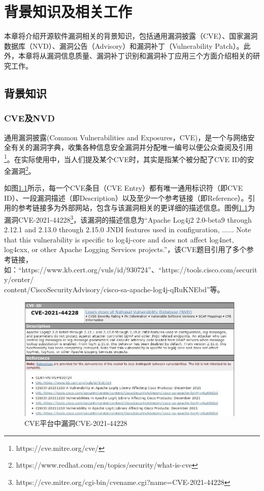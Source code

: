 \chapter{背景知识及相关工作}
本章将介绍开源软件漏洞相关的背景知识，包括通用漏洞披露（CVE）、国家漏洞数据库（NVD）、漏洞公告（Advisory）和漏洞补丁（Vulnerability Patch）。此外，本章将从漏洞信息质量、漏洞补丁识别和漏洞补丁应用三个方面介绍相关的研究工作。


\section{背景知识}

\subsection{CVE及NVD} 
通用漏洞披露(Common Vulnerabilities and Exposures，CVE)\cite{mitre2021:cve}，是一个与网络安全有关的漏洞字典，收集各种信息安全漏洞并分配唯一编号以便公众查阅及引用\footnote{https://cve.mitre.org/cve/}。在实际使用中，当人们提及某个CVE时，其实是指某个被分配了CVE ID的安全漏洞\footnote{https://www.redhat.com/en/topics/security/what-is-cve}。

如图\ref{fig:CVE-2021-44228}所示，每一个CVE条目（CVE Entry）都有唯一通用标识符（即CVE ID）、一段漏洞描述（即Description）以及至少一个参考链接（即Reference）。引用的参考链接多为外部网站，包含与该漏洞相关的更详细的描述信息。图例\ref{fig:CVE-2021-44228}为漏洞CVE-2021-44228\footnote{https://cve.mitre.org/cgi-bin/cvename.cgi?name=CVE-2021-44228}，该漏洞的描述信息为“Apache Log4j2 2.0-beta9 through 2.12.1 and 2.13.0 through 2.15.0 JNDI features used in configuration, ...... Note that this vulnerability is specific to log4j-core and does not affect log4net, log4cxx, or other Apache Logging Services projects.”，该CVE题目引用了多个参考链接，如：“https://www.kb.cert.org/vuls/id/930724”、“https://tools.cisco.com/security/center/\\content/CiscoSecurityAdvisory/cisco-sa-apache-log4j-qRuKNEbd”等。

\begin{figure}[!t]
    \centering
    \includegraphics[width=0.98\textwidth]{fig/CVE-2021-44228-2}
    \caption{CVE平台中漏洞CVE-2021-44228}\label{fig:CVE-2021-44228}
\end{figure}

